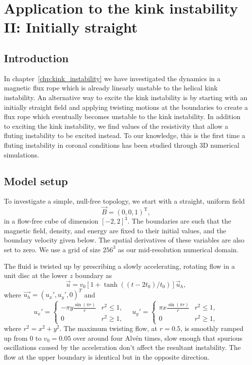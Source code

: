 \chapter{Application to the kink instability II: Initially straight}

\graphicspath{{images/kink_instability/}}

\section{Introduction}

In chapter~\ref{chp:kink_instability} we have investigated the dynamics in a magnetic flux rope which is already linearly unstable to the helical kink instability. An alternative way to excite the kink instability is by starting with an initially straight field and applying twisting motions at the boundaries to create a flux rope which eventually becomes unstable to the kink instability. In addition to exciting the kink instability, we find values of the resistivity that allow a fluting instability to be excited instead. To our knowledge, this is the first time a fluting instability in coronal conditions has been studied through 3D numerical simulations. 

\section{Model setup}

To investigate a simple, null-free topology, we start with a straight, uniform field
\begin{equation}
\vec{B} = (0, 0, 1)^{\text{T}},
\end{equation}
in a flow-free cube of dimension $[-2,2]^3$. The boundaries are such that the magnetic field, density, and energy are fixed to their initial values, and the boundary velocity given below. The spatial derivatives of these variables are also set to zero. We use a grid of size $256^3$ as our mid-resolution numerical domain. 

The fluid is twisted up by prescribing a slowly accelerating, rotating flow in a unit disc at the lower $z$ boundary as
\begin{equation}
\vec{u} = v_0 [1 + \tanh((t - 2t_0)/t_0)] \vec{u}_h,
\end{equation}
where $\vec{u_h} = (u_x', u_y', 0)^T$ and
\begin{equation}
u_x' = 
  \begin{cases} 
    -\pi y \frac{\sin(\pi r)}{r} & r^2 \le 1, \\
    0 & r^2 \geq 1,
  \end{cases}
\quad
u_y' = 
  \begin{cases} 
    \pi x \frac{\sin(\pi r)}{r} & r^2 \le 1, \\
    0 & r^2 \geq 1,
  \end{cases}
\end{equation}
where $r^2 = x^2 + y^2$. The maximum twisting flow, at $r=0.5$, is smoothly ramped up from $0$ to $v_0 = 0.05$ over around four Alv\'en times, slow enough that spurious oscillations caused by the acceleration don't affect the resultant instability. The flow at the upper boundary is identical but in the opposite direction.

